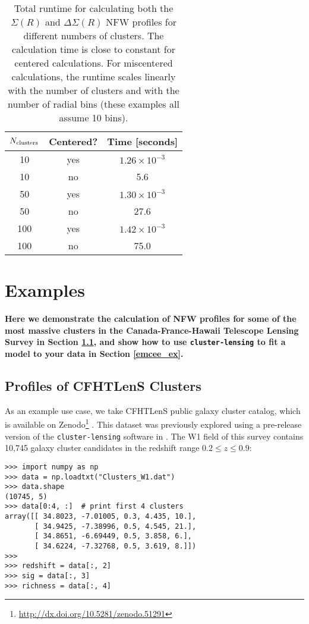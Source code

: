 \documentclass[twocolumn]{aastex6}
\newcommand{\code}{\lstinline[style=codeintext]}
\begin{document}
\begin{table}
\centering
\begin{tabular}{ccc}
	$N_{\rm clusters}$ & Centered? & Time [seconds] \\ \hline
	10   & yes & $1.26\times10^{-3}$ \\
	10   & no  & 5.6 \\ 
	50   & yes & $1.30\times10^{-3}$ \\
	50   & no  & 27.6 \\
	100 & yes & $1.42\times10^{-3}$ \\
	100 & no  & 75.0 \\
	
\end{tabular}
\caption{Total runtime for calculating both the $\Sigma(R)$ and $\Delta\Sigma(R)$ NFW profiles for different numbers of clusters. The calculation time is close to constant for centered calculations. For miscentered calculations, the runtime scales linearly with the number of clusters and with the number of radial bins (these examples all assume 10 bins).}
\label{runtimetable}
\end{table}


\section{Examples}
\label{ex}
{\bf Here we demonstrate the calculation of NFW profiles for some of the most massive clusters in the Canada-France-Hawaii Telescope Lensing Survey \citep[CFHTLenS;][]{Heymans12, Erben13} in Section \ref{cfhtlens_ex}, and show how to use \code{cluster-lensing} to fit a model to your data in Section \ref{emcee_ex}.}


\subsection{Profiles of CFHTLenS Clusters}
\label{cfhtlens_ex}

As an example use case, we take CFHTLenS public galaxy cluster catalog, which is available on Zenodo\footnote{\url{http://dx.doi.org/10.5281/zenodo.51291}} \citep{3DMFcatalog}. This dataset was previously explored using a pre-release version of the \code{cluster-lensing} software in \citet{Ford14, Ford15}. The W1 field of this survey contains 10,745 galaxy cluster candidates in the redshift range $0.2 \le z \le 0.9$:
\begin{verbatim}
>>> import numpy as np
>>> data = np.loadtxt("Clusters_W1.dat")
>>> data.shape
(10745, 5)
>>> data[0:4, :]  # print first 4 clusters
array([[ 34.8023, -7.01005, 0.3, 4.435, 10.],
       [ 34.9425, -7.38996, 0.5, 4.545, 21.],
       [ 34.8651, -6.69449, 0.5, 3.858, 6.],
       [ 34.6224, -7.32768, 0.5, 3.619, 8.]])
>>>
>>> redshift = data[:, 2]
>>> sig = data[:, 3]
>>> richness = data[:, 4]
\end{verbatim}
\end{document}

